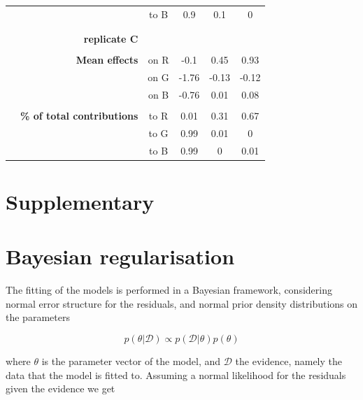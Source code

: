 \documentclass[11pt, oneside]{article}
\newcommand{\beginsupplement}{%
        \setcounter{table}{0}
        \renewcommand{\thetable}{S\arabic{table}}%
        \setcounter{figure}{0}
        \renewcommand{\thefigure}{S\arabic{figure}}%
     }
\begin{document}
\begin{table}[H]
\begin{center}
\begin{tabular}{rrcccc}
    & & to B &  0.9  & 0.1  & 0    \\
	& \\
	\hline
	& \\
	& \textbf{replicate C} \\
	& \\
	& \textbf{Mean effects} 
    &   on R & -0.1  &  0.45 &  0.93 \\
    & & on G & -1.76 & -0.13 & -0.12 \\
    & & on B & -0.76 &  0.01 &  0.08 \\
	& \\
	& \textbf{\% of total contributions} 
	& to R   & 0.01 & 0.31 & 0.67 \\
    & & to G & 0.99 & 0.01 & 0    \\
    & & to B & 0.99 & 0    & 0.01 \\
\end{tabular}
\end{center}
\end{table}
\newpage



\newpage
\section{Supplementary}
\appendix
\beginsupplement

\section{Bayesian regularisation}

The fitting of the models is performed in a Bayesian framework, considering normal error structure for the residuals, and normal prior density distributions on the parameters

\vspace{-0.5cm}
\begin{equation}
	p(\theta | \mathcal{D}) \propto  p(\mathcal{D} | \theta) p(\theta)
\end{equation}

where $\theta$ is the parameter vector of the model, and $\mathcal{D}$ the evidence, namely the data that the model is fitted to.
Assuming a normal likelihood for the residuals given the evidence we get
\end{document}
